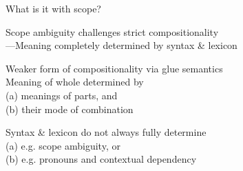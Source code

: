 \begin{hslide}{What is it with scope?}
\begin{items}
\item Scope ambiguity challenges strict compositionality\\
{\small\hspace*{1em}---Meaning completely determined by syntax \& lexicon}

\item Weaker form of compositionality via glue semantics\\
{\small Meaning of whole determined by\\
\hspace*{1em} (a) meanings of parts, and\\
\hspace*{1em} (b) their
mode of combination}

{\small Syntax \& lexicon do not always fully determine \\
(a) e.g. scope ambiguity, or\\
(b) e.g. pronouns and contextual dependency}
\end{items}
\end{hslide}

